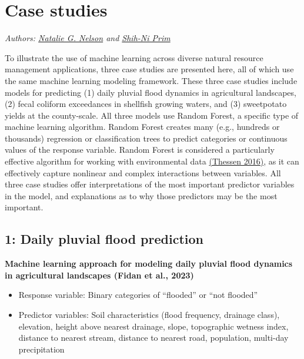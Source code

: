 \documentclass[
]{book}
\providecommand{\tightlist}{%
  \setlength{\itemsep}{0pt}\setlength{\parskip}{0pt}}
\begin{document}
\hypertarget{case-studies}{%
\chapter{Case studies}\label{case-studies}}

\emph{Authors: \href{https://bae.ncsu.edu/people/nnelson4/}{Natalie G. Nelson} and \href{https://www.linkedin.com/in/shih-ni-prim-14033336/}{Shih-Ni Prim}}

To illustrate the use of machine learning across diverse natural resource management applications, three case studies are presented here, all of which use the same machine learning modeling framework. These three case studies include models for predicting (1) daily pluvial flood dynamics in agricultural landscapes, (2) fecal coliform exceedances in shellfish growing waters, and (3) sweetpotato yields at the county-scale. All three models use Random Forest, a specific type of machine learning algorithm. Random Forest creates many (e.g., hundreds or thousands) regression or classification trees to predict categories or continuous values of the response variable. Random Forest is considered a particularly effective algorithm for working with environmental data \href{https://doi.org/10.3897/oneeco.1.e8621}{(Thessen 2016)}, as it can effectively capture nonlinear and complex interactions between variables. All three case studies offer interpretations of the most important predictor variables in the model, and explanations as to why those predictors may be the most important.

\hypertarget{daily-pluvial-flood-prediction}{%
\section{1: Daily pluvial flood prediction}\label{daily-pluvial-flood-prediction}}

\textbf{Machine learning approach for modeling daily pluvial flood dynamics in agricultural landscapes (Fidan et al., 2023)}

\begin{itemize}
\tightlist
\item
  Response variable: Binary categories of ``flooded'' or ``not flooded''
\item
  Predictor variables: Soil characteristics (flood frequency, drainage class), elevation, height above nearest drainage, slope, topographic wetness index, distance to nearest stream, distance to nearest road, population, multi-day precipitation
\end{itemize}
\end{document}
